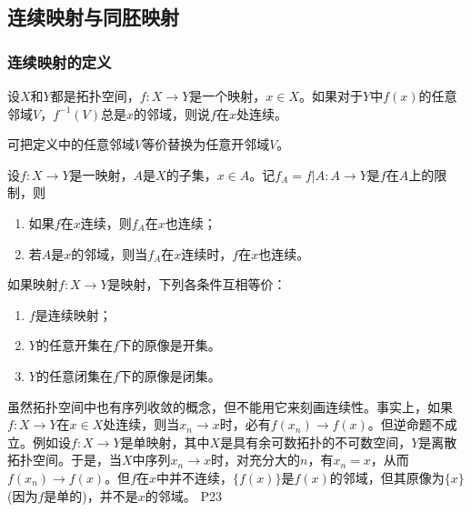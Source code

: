 \subsection{连续映射与同胚映射}

\subsubsection{连续映射的定义}

\begin{definition}[局部连续的定义]
    设$X$和$Y$都是拓扑空间，$f:X\rightarrow Y$是一个映射，$x\in X$。如果对于$Y$中$f(x)$的任意邻域$V$，$f^{-1}(V)$总是$x$的邻域，则说$f$在$x$处连续。
\end{definition}

\begin{remark}
    可把定义中的任意邻域$V$等价替换为任意开邻域$V$。
\end{remark}

\begin{proposition}
    设$f:X\rightarrow Y$是一映射，$A$是$X$的子集，$x\in A$。记$f_A=f\big| A:A\rightarrow Y$是$f$在$A$上的限制，则
    \begin{enumerate}
        \item 如果$f$在$x$连续，则$f_A$在$x$也连续；
        \item 若$A$是$x$的邻域，则当$f_A$在$x$连续时，$f$在$x$也连续。
    \end{enumerate}
\end{proposition}

\begin{definition}
    如果映射$f:X\rightarrow Y$是映射，下列各条件互相等价：
    \begin{enumerate}
        \item $f$是连续映射；
        \item $Y$的任意开集在$f$下的原像是开集。
        \item $Y$的任意闭集在$f$下的原像是闭集。
    \end{enumerate}
\end{definition}

\original
{
    虽然拓扑空间中也有序列收敛的概念，但不能用它来刻画连续性。事实上，如果$f:X\rightarrow Y$在$x\in X$处连续，则当$x_n\rightarrow x$时，必有$f(x_n)\rightarrow f(x)$。但逆命题不成立。例如设$f:X\rightarrow Y$是单映射，其中$X$是具有余可数拓扑的不可数空间，$Y$是离散拓扑空间。于是，当$X$中序列$x_n\rightarrow x$时，对充分大的$n$，有$x_n=x$，从而$f(x_n)\rightarrow f(x)$。但$f$在$x$中并不连续，$\{f(x)\}$是$f(x)$的邻域，但其原像为$\{x\}$(因为$f$是单的)，并不是$x$的邻域。
}
{P23}

